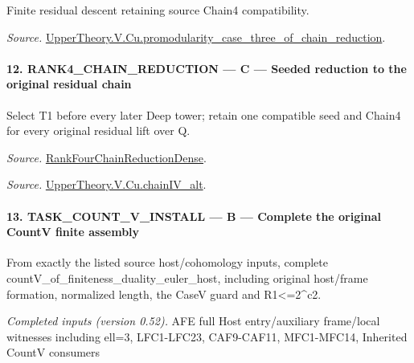\documentclass[11pt,a4paper]{article}
\numberwithin{equation}{section}
\theoremstyle{remark}\newtheorem{remark}[theorem]{Remark}
\begin{document}
Finite residual descent retaining source Chain4 compatibility.

\emph{Source.} \href{https://github.com/CocoSgt/riemann-hypothesis-lean/blob/7cbf7a0c32fca1badf05931879a37c3f8a2b03b4/src/Development/AutomorphicArithmetic/AutomorphicVarieties/ModularityArgument/ThresholdArguments/DenseThresholdCases/PromodularityCaseThreeOfLemmas.lean#L131-L153}{UpperTheory.V.Cu.promodularity\_\allowbreak case\_\allowbreak three\_\allowbreak of\_\allowbreak chain\_\allowbreak reduction}.



\paragraph{12. RANK4\_\allowbreak CHAIN\_\allowbreak REDUCTION — C — Seeded reduction to the original residual chain}

Select T1 before every later Deep tower; retain one compatible seed and Chain4 for every original residual lift over Q.

\emph{Source.} \href{https://github.com/CocoSgt/riemann-hypothesis-lean/blob/7cbf7a0c32fca1badf05931879a37c3f8a2b03b4/src/Development/AutomorphicArithmetic/AutomorphicVarieties/ModularityArgument/ThresholdArguments/DenseThresholdCases/PromodularityCaseThree.lean#L33-L39}{RankFourChainReductionDense}.

\emph{Source.} \href{https://github.com/CocoSgt/riemann-hypothesis-lean/blob/7cbf7a0c32fca1badf05931879a37c3f8a2b03b4/src/Development/AutomorphicArithmetic/AutomorphicVarieties/ModularityArgument/ThresholdArguments/DenseThresholdCases/CuPChainIV.lean#L16-L82}{UpperTheory.V.Cu.chainIV\_\allowbreak alt}.



\paragraph{13. TASK\_\allowbreak COUNT\_\allowbreak V\_\allowbreak INSTALL — B — Complete the original CountV finite assembly}

From exactly the listed source host/cohomology inputs, complete countV\_\allowbreak of\_\allowbreak finiteness\_\allowbreak duality\_\allowbreak euler\_\allowbreak host, including original host/frame formation, normalized length, the CaseV guard and R1<=2\textasciicircum{}c2.

\emph{Completed inputs (version 0.52).} AFE full Host entry/auxiliary frame/local witnesses including ell=3, LFC1-LFC23, CAF9-CAF11, MFC1-MFC14, Inherited CountV consumers
\end{document}
